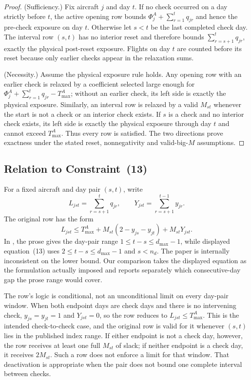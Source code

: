 \begin{proof}
  (Sufficiency.) Fix aircraft $j$ and day $t$. If no check occurred on a day
  strictly before $t$, the active opening row bounds
  $\Phi^A_j+\sum_{r=1}^{t}q_{jr}$ and hence the pre-check exposure on day $t$.
  Otherwise let $s<t$ be the last completed check day. The interval row
  $(s,t)$ has no interior reset and therefore bounds
  $\sum_{r=s+1}^{t}q_{jr}$, exactly the physical post-reset exposure.
  Flights on day $t$ are counted before its reset because only earlier checks
  appear in the relaxation sums.

  (Necessity.) Assume the physical exposure rule holds. Any opening row with
  an earlier check is relaxed by a coefficient selected large enough for
  $\Phi^A_j+\sum_{r=1}^{t}q_{jr}-T^A_{\max}$; without an earlier check, its
  left side is exactly the physical exposure. Similarly, an interval row is
  relaxed by a valid $M_{st}$ whenever the start is not a check or an interior
  check exists. If $s$ is a check and no interior check exists, its left side is
  exactly the physical exposure through day $t$ and cannot exceed $T^A_{\max}$.
  Thus every row is satisfied. The two directions prove exactness under the
  stated reset, nonnegativity and valid-big-$M$ assumptions.
\end{proof}

\subsection{Relation to Constraint~(13)}

For a fixed aircraft and day pair $(s,t)$, write
\[
  L_{jst}=\sum_{r=s+1}^{t}q_{jr}, \qquad
  Y_{jst}=\sum_{r=s+1}^{t-1}y_{jr}.
\]
The original row has the form
\begin{equation}\label{eq:a_c13_original}
  L_{jst}\le T^A_{\max}
    +M_{st}(2-y_{js}-y_{jt})+M_{st}Y_{jst}.
\end{equation}
In \citet{khaled2018compact}, the prose gives the day-pair range
$1\le t-s\le d_{\max}-1$, while displayed equation~(13) uses
$2\le t-s\le d_{\max}-1$ and $s<n_d$. The paper is internally inconsistent
on the lower bound. Our comparison takes the displayed equation as the
formulation actually imposed and reports separately which consecutive-day
gap the prose range would cover.

The row's logic is conditional, not an unconditional limit on every day-pair
window. When both endpoint days are check days and there is no intervening
check, $y_{js}=y_{jt}=1$ and $Y_{jst}=0$, so the row reduces to
$L_{jst}\le T^A_{\max}$. This is the intended check-to-check case, and the
original row is valid for it whenever $(s,t)$ lies in the published index
range. If either endpoint is not a check day, however,
the row receives at least one full $M_{st}$ of slack; if neither endpoint is
a check day, it receives $2M_{st}$. Such a row does not enforce a limit for
that window. That deactivation is appropriate when the pair does not bound
one complete interval between checks.

